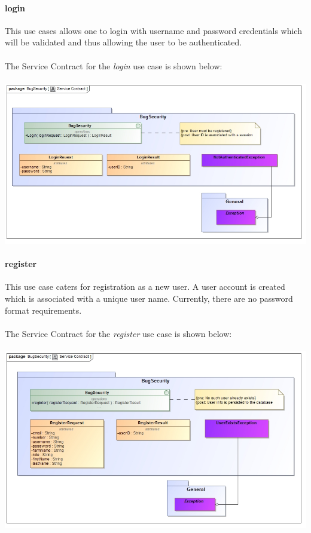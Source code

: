 \documentclass[11pt,a4paper,titlepage]{article}
\begin{document}
		\paragraph{login }
		This use cases allows one to login with username and password credentials which will be validated and thus allowing the user to be authenticated.\\\hfill\\
		The Service Contract for the \textit{login} use case is shown below:\\\hfill\\\includegraphics[width=\linewidth]{LoginSC}
		
		\paragraph{register }
		This use case caters for registration as a new user. A user account is created which is associated with a unique user name. Currently, there are no password format requirements.\\\hfill\\
		The Service Contract for the \textit{register} use case is shown below:\\\hfill\\
		\includegraphics[width=\linewidth]{RegisterSC}		
		
\end{document}
